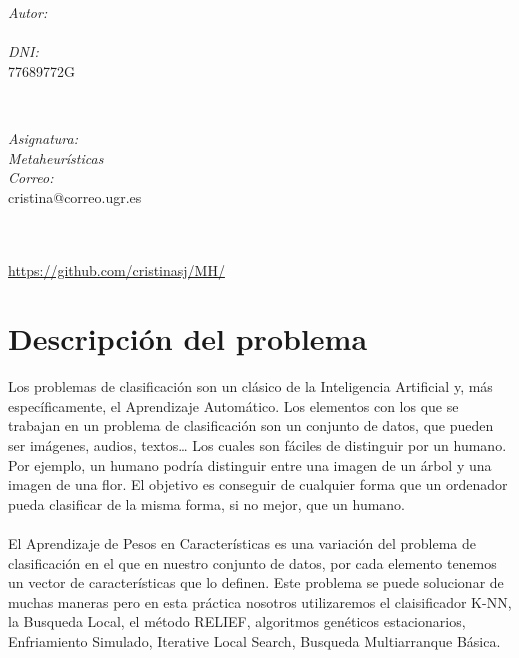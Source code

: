 \documentclass[12pt, spanish]{article}
\makeatletter
\let\theauthor\@author
\let\thedate\@date
\makeatother
\begin{document}
\begin{titlepage}
    \begin{minipage}{0.4\textwidth}
        \begin{flushleft} \large
            \emph{Autor:}\\
            \theauthor\\ 
			 \emph{DNI:}\\
            77689772G
            \end{flushleft}
            \end{minipage}~
            \begin{minipage}{0.4\textwidth}
            \begin{flushright} \large
            \emph{Asignatura: \\
            Metaheurísticas}   \\     
            \emph{Correo:}\\
            cristina@correo.ugr.es           
        \end{flushright}
    \end{minipage}\\[0.5cm]
  
    {\large \thedate}\\[0.5cm]
    {\url{https://github.com/cristinasj/MH/}}
 	
    \vfill
    
\end{titlepage}


\tableofcontents
\pagebreak



\section{Descripción del problema}
Los problemas de clasificación son un clásico de la Inteligencia Artificial y, más específicamente, el Aprendizaje Automático. Los elementos con los que se trabajan en un problema de clasificación son un conjunto de datos, que pueden ser imágenes, audios, textos… Los cuales son fáciles de distinguir por un humano. Por ejemplo, un humano podría distinguir entre una imagen de un árbol y una imagen de una flor. El objetivo es conseguir de cualquier forma que un ordenador pueda clasificar de la misma forma, si no mejor, que un humano.  \\ \\
El Aprendizaje de Pesos en Características es una variación del problema de
clasificación en el que en nuestro conjunto de datos, por cada elemento tenemos un 
vector de características que lo definen. Este problema se puede solucionar de muchas 
maneras pero en esta práctica nosotros utilizaremos el claisificador K-NN, la Busqueda
Local, el método RELIEF, algoritmos genéticos estacionarios, Enfriamiento Simulado, 
Iterative Local Search, Busqueda Multiarranque Básica.  
\pagebreak
\end{document}
